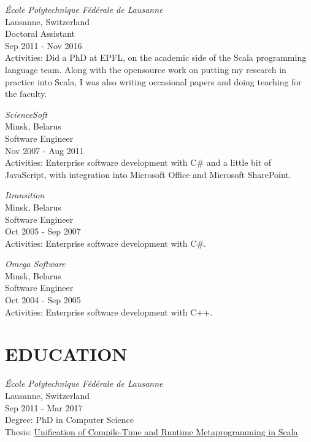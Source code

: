 \documentclass[margin, 10pt]{Stylesheet}
\begin{document}
\begin{resume}
\emph{\'{E}cole Polytechnique F\'{e}d\'{e}rale de Lausanne} \\
Lausanne, Switzerland \\
Doctoral Assistant \\
Sep 2011 - Nov 2016 \\
Activities: Did a PhD at EPFL, on the academic side of the Scala programming language team.
Along with the opensource work on putting my research in practice into Scala, I was also writing
occasional papers and doing teaching for the faculty.

\emph{ScienceSoft} \\
Minsk, Belarus \\
Software Engineer \\
Nov 2007 - Aug 2011 \\
Activities: Enterprise software development with C\# and a little bit of JavaScript,
with integration into Microsoft Office and Microsoft SharePoint.

\emph{Itransition} \\
Minsk, Belarus \\
Software Engineer \\
Oct 2005 - Sep 2007 \\
Activities: Enterprise software development with C\#.

\emph{Omega Software} \\
Minsk, Belarus \\
Software Engineer \\
Oct 2004 - Sep 2005 \\
Activities: Enterprise software development with C++.

\section{EDUCATION}

\emph{\'{E}cole Polytechnique F\'{e}d\'{e}rale de Lausanne} \\
Lausanne, Switzerland \\
Sep 2011 - Mar 2017 \\
Degree: PhD in Computer Science \\
Thesis: \href{https://infoscience.epfl.ch/record/226166}{Unification of Compile-Time and Runtime Metaprogramming in Scala} \\


\end{resume}
\end{document}
